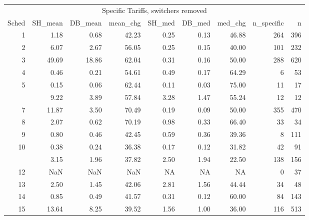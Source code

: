 \documentclass[
  12pt,
]{article}
\begin{document}
\begin{table}[!h]
\centering
\begin{tabular}[t]{rrrrrrrrr}
\toprule
\multicolumn{9}{c}{\bgroup\fontsize{12}{14}\selectfont Specific Tariffs, switchers removed\egroup{}} \\
\cmidrule(l{3pt}r{3pt}){1-9}
Sched & SH\_mean & DB\_mean & mean\_chg & SH\_med & DB\_med & med\_chg & n\_specific & n\\
\midrule
1 & 1.18 & 0.68 & 42.23 & 0.25 & 0.13 & 46.88 & 264 & 396\\
2 & 6.07 & 2.67 & 56.05 & 0.25 & 0.15 & 40.00 & 101 & 232\\
3 & 49.69 & 18.86 & 62.04 & 0.31 & 0.16 & 50.00 & 288 & 620\\
4 & 0.46 & 0.21 & 54.61 & 0.49 & 0.17 & 64.29 & 6 & 53\\
5 & 0.15 & 0.06 & 62.44 & 0.11 & 0.03 & 75.00 & 11 & 17\\
\addlinespace
6 & 9.22 & 3.89 & 57.84 & 3.28 & 1.47 & 55.24 & 12 & 12\\
7 & 11.87 & 3.50 & 70.49 & 0.19 & 0.09 & 50.00 & 355 & 470\\
8 & 2.07 & 0.62 & 70.19 & 0.98 & 0.33 & 66.40 & 33 & 34\\
9 & 0.80 & 0.46 & 42.45 & 0.59 & 0.36 & 39.36 & 8 & 111\\
10 & 0.38 & 0.24 & 36.38 & 0.17 & 0.12 & 31.82 & 42 & 91\\
\addlinespace
11 & 3.15 & 1.96 & 37.82 & 2.50 & 1.94 & 22.50 & 138 & 156\\
12 & NaN & NaN & NaN & NA & NA & NA & 0 & 37\\
13 & 2.50 & 1.45 & 42.06 & 2.81 & 1.56 & 44.44 & 34 & 48\\
14 & 0.85 & 0.49 & 41.57 & 0.31 & 0.12 & 60.00 & 84 & 143\\
15 & 13.64 & 8.25 & 39.52 & 1.56 & 1.00 & 36.00 & 116 & 513\\
\bottomrule
\end{tabular}
\end{table}
\end{document}
